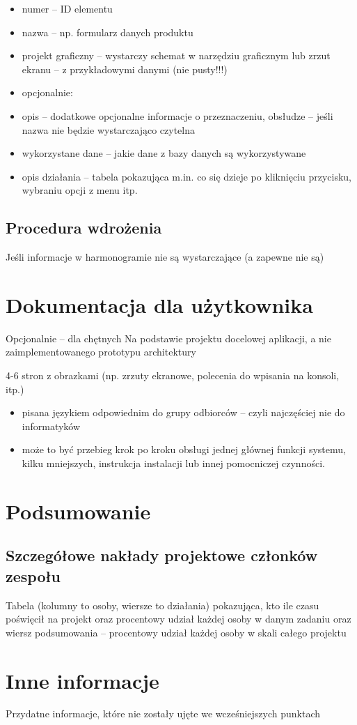 \documentclass[a4paper,12pt]{article}
\begin{document}
\begin{itemize}
    \item numer – ID elementu
    \item nazwa – np. formularz danych produktu
    \item projekt graficzny – wystarczy schemat w narzędziu graficznym lub zrzut ekranu – z przykładowymi danymi (nie pusty!!!)
    \item opcjonalnie:
    \item opis – dodatkowe opcjonalne informacje o przeznaczeniu, obsłudze – jeśli nazwa nie będzie wystarczająco czytelna
    \item wykorzystane dane – jakie dane z bazy danych są wykorzystywane
    \item opis działania – tabela pokazująca m.in. co się dzieje po kliknięciu przycisku, wybraniu opcji z menu itp.
\end{itemize}

\subsection{Procedura wdrożenia}
Jeśli informacje w harmonogramie nie są wystarczające (a zapewne nie są)

\newpage

\section{Dokumentacja dla użytkownika}
Opcjonalnie – dla chętnych
Na podstawie projektu docelowej aplikacji, a nie zaimplementowanego prototypu architektury

4-6 stron z obrazkami (np. zrzuty ekranowe, polecenia do wpisania na konsoli, itp.)
\begin{itemize}
    \item pisana językiem odpowiednim do grupy odbiorców – czyli najczęściej nie do informatyków
    \item może to być przebieg krok po kroku obsługi jednej głównej funkcji systemu, kilku mniejszych, instrukcja instalacji lub innej pomocniczej czynności.
\end{itemize}

\newpage

\section{Podsumowanie}
\subsection{Szczegółowe nakłady projektowe członków zespołu}
Tabela (kolumny to osoby, wiersze to działania) pokazująca, kto ile czasu poświęcił na projekt oraz procentowy udział każdej osoby w danym zadaniu oraz wiersz podsumowania – procentowy udział każdej osoby w skali całego projektu

\newpage
\section{Inne informacje}
Przydatne informacje, które nie zostały ujęte we wcześniejszych punktach
\end{document}
